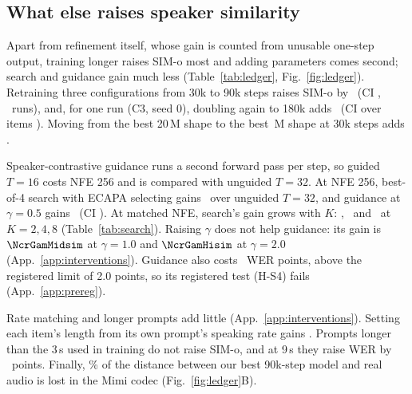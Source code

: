 \subsection{What else raises speaker similarity}
\label{sec:identity}
Apart from refinement itself, whose gain is counted from unusable one-step output, training
longer raises SIM-o most and adding parameters comes second; search and guidance gain much
less (Table~\ref{tab:ledger}, Fig.~\ref{fig:ledger}). Retraining three
configurations from 30k to 90k steps raises SIM-o by \NtrainGainSim\ (CI \NtrainGainCI,
\NtrainGainRuns\ runs), and, for one run (C3, seed 0), doubling again to 180k adds \NtrainDouble\ (CI over items
\NtrainDoubleCI). Moving from the best 20\,M shape to the best \NmaxNfour\,M shape at 30k steps
adds \NparamGainSim.

Speaker-contrastive guidance runs a second forward pass per step, so guided $T{=}16$ costs
NFE 256 and is compared with unguided $T{=}32$. At NFE 256, best-of-4 search with ECAPA
selecting gains \NcrXEWMidd\ over unguided $T{=}32$, and guidance at $\gamma{=}0.5$ gains
\NcrGuideGainSim\ (CI \NcrGuideGainCI). At matched NFE, search's gain grows with $K$:
\NcrXEWLod, \NcrXEWMidd\ and \NcrXEWHid\ at $K=2,4,8$ (Table~\ref{tab:search}). Raising
$\gamma$ does not help guidance: its gain is $\NcrGamMidsim$ at $\gamma{=}1.0$ and
$\NcrGamHisim$ at $\gamma{=}2.0$ (App.~\ref{app:interventions}). Guidance also costs
\NcrGuideWER\ WER points, above the registered limit of 2.0 points, so its registered test
(H-S4) fails (App.~\ref{app:prereg}).

Rate matching and longer prompts add little (App.~\ref{app:interventions}). Setting each
item's length from its own prompt's speaking rate gains \NrateGainSim. Prompts longer than
the 3\,s used in training do not raise SIM-o, and at 9\,s they raise WER by \NctxWerCost\
points. Finally, \NcodecShare\% of the distance between our best 90k-step model and real
audio is lost in the Mimi codec (Fig.~\ref{fig:ledger}B).
